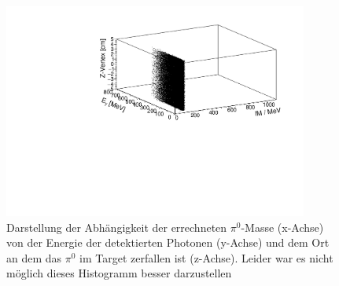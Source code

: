 \documentclass[a4paper,11pt,oneside,final,german,openbib,pdftex]{scrbook}
\begin{document}
{\begin{appendix}
\begin{figure}[h!]
	\begin{center}
		\includegraphics[width=100mm]{NewCalib/20171904SimZVertex3DHist}
		\caption[Simulation: 3D-Hist Z-Vertex]{Darstellung der Abh\"angigkeit der errechneten $\pi^0$-Masse (x-Achse) von der Energie der detektierten Photonen (y-Achse) und dem Ort an dem das $\pi^0$ im Target zerfallen ist (z-Achse).
		Leider war es nicht m\"oglich dieses Histogramm besser darzustellen}
	\label{fig:Z-Vertex-3D-Hist}
	\end{center}
\end{figure}

\end{appendix}}
\end{document}
